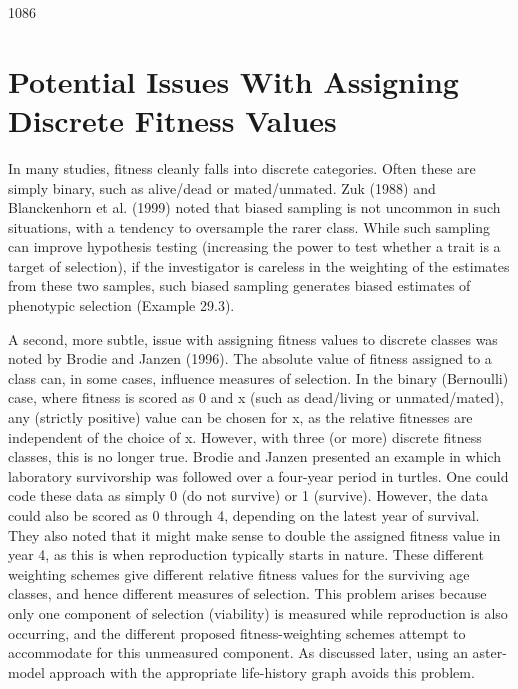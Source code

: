 \documentclass{article}
\begin{document}
1086

\section{Potential Issues With Assigning Discrete Fitness Values}
In many studies, fitness cleanly falls into discrete categories. Often these are simply binary, such as alive/dead or mated/unmated. Zuk (1988) and Blanckenhorn et al. (1999) noted that biased sampling is not uncommon in such situations, with a tendency to oversample the rarer class. While such sampling can improve hypothesis testing (increasing the power to test whether a trait is a target of selection), if the investigator is careless in the weighting of the estimates from these two samples, such biased sampling generates biased estimates of phenotypic selection (Example 29.3).

A second, more subtle, issue with assigning fitness values to discrete classes was noted by Brodie and Janzen (1996). The absolute value of fitness assigned to a class can, in some cases, influence measures of selection. In the binary (Bernoulli) case, where fitness is scored as 0 and x (such as dead/living or unmated/mated), any (strictly positive) value can be chosen for x, as the relative fitnesses are independent of the choice of x. However, with three (or more) discrete fitness classes, this is no longer true. Brodie and Janzen presented an example in which laboratory survivorship was followed over a four-year period in turtles. One could code these data as simply 0 (do not survive) or 1 (survive). However, the data could also be scored as 0 through 4, depending on the latest year of survival. They also noted that it might make sense to double the assigned fitness value in year 4, as this is when reproduction typically starts in nature. These different weighting schemes give different relative fitness values for the surviving age classes, and hence different measures of selection. This problem arises because only one component of selection (viability) is measured while reproduction is also occurring, and the different proposed fitness-weighting schemes attempt to accommodate for this unmeasured component. As discussed later, using an aster-model approach with the appropriate life-history graph avoids this problem.
\end{document}
